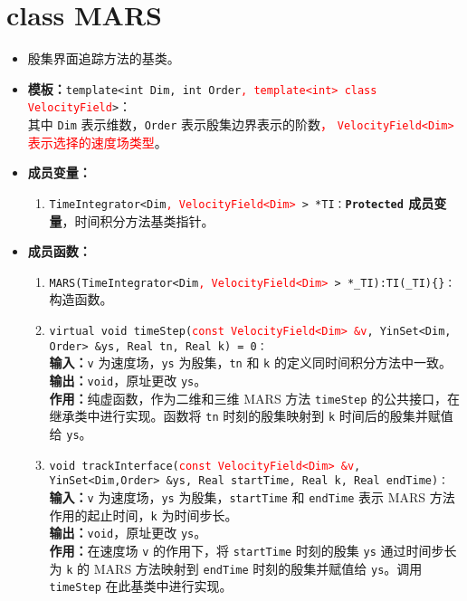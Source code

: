 \documentclass[a4paper,twoside]{ctexart}
\begin{document}
\section{class MARS}
\begin{itemize}
    \item 殷集界面追踪方法的基类。
    \item \textbf{模板：}\texttt{template<int Dim, int Order}\textcolor{red}{\texttt{,
        template<int> class VelocityField}}\texttt{>}：\\
    其中 \texttt{Dim} 表示维数，\texttt{Order} 表示殷集边界表示的阶数\textcolor{red}{，
    \texttt{VelocityField<Dim>} 表示选择的速度场类型}。
    \item \textbf{成员变量：}
        \begin{enumerate}[(1)]
            \item \texttt{TimeIntegrator<Dim}\textcolor{red}{\texttt{,
        VelocityField<Dim> }}\texttt{> *TI：}\textbf{\texttt{Protected}  成员变量}，时间积分方法基类指针。
        \end{enumerate}
    \item \textbf{成员函数：}
        \begin{enumerate}[(1)]
            \item \texttt{MARS(TimeIntegrator<Dim}\textcolor{red}{\texttt{,
        VelocityField<Dim> }}\texttt{> *\_TI):TI(\_TI)\{\}：}\\构造函数。
            \item \texttt{virtual void
                timeStep(}\textcolor{red}{\texttt{const VelocityField<Dim> \&v}}\texttt{, YinSet<Dim, Order> \&ys, Real tn, Real k) = 0：}\\
            \textbf{输入：}\texttt{v} 为速度场，\texttt{ys} 为殷集，\texttt{tn} 和 \texttt{k} 的定义同时间积分方法中一致。\\
            \textbf{输出：}\texttt{void}，原址更改 \texttt{ys}。\\
            \textbf{作用：}纯虚函数，作为二维和三维 MARS 方法 \texttt{timeStep} 的公共接口，在继承类中进行实现。函数将 \texttt{tn} 时刻的殷集映射到 \texttt{k} 时间后的殷集并赋值给 \texttt{ys}。
            \item \texttt{void
                trackInterface(}\textcolor{red}{\texttt{const VelocityField<Dim> \&v}}\texttt{, YinSet<Dim,Order> \&ys, Real startTime, Real k, Real endTime)：}\\
            \textbf{输入：}\texttt{v} 为速度场，\texttt{ys} 为殷集，\texttt{startTime} 和 \texttt{endTime} 表示 MARS 方法作用的起止时间，\texttt{k} 为时间步长。\\
            \textbf{输出：}\texttt{void}，原址更改 \texttt{ys}。\\
            \textbf{作用：}在速度场 \texttt{v} 的作用下，将 \texttt{startTime} 时刻的殷集 \texttt{ys} 通过时间步长为 \texttt{k} 的 MARS 方法映射到 \texttt{endTime} 时刻的殷集并赋值给 \texttt{ys}。调用 \texttt{timeStep} 在此基类中进行实现。
        \end{enumerate}
\end{itemize}
\end{document}
